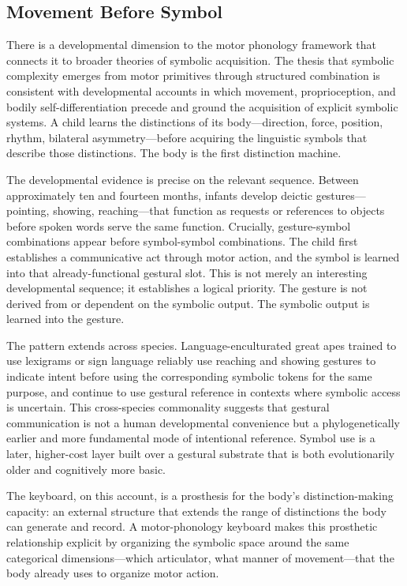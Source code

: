\documentclass[12pt,a4paper]{article}
\theoremstyle{plain}
\theoremstyle{definition}
\theoremstyle{remark}
\begin{document}
\subsection{Movement Before Symbol}

There is a developmental dimension to the motor phonology framework that connects
it to broader theories of symbolic acquisition. The thesis that symbolic
complexity emerges from motor primitives through structured combination is
consistent with developmental accounts in which movement, proprioception, and
bodily self-differentiation precede and ground the acquisition of explicit
symbolic systems. A child learns the distinctions of its body---direction,
force, position, rhythm, bilateral asymmetry---before acquiring the linguistic
symbols that describe those distinctions. The body is the first distinction
machine.

The developmental evidence is precise on the relevant sequence. Between
approximately ten and fourteen months, infants develop deictic gestures---
pointing, showing, reaching---that function as requests or references to objects
before spoken words serve the same function. Crucially, gesture-symbol
combinations appear before symbol-symbol combinations. The child first
establishes a communicative act through motor action, and the symbol is learned
into that already-functional gestural slot. This is not merely an interesting
developmental sequence; it establishes a logical priority. The gesture is not
derived from or dependent on the symbolic output. The symbolic output is learned
into the gesture.

The pattern extends across species. Language-enculturated great apes trained to
use lexigrams or sign language reliably use reaching and showing gestures to
indicate intent before using the corresponding symbolic tokens for the same
purpose, and continue to use gestural reference in contexts where symbolic access
is uncertain. This cross-species commonality suggests that gestural communication
is not a human developmental convenience but a phylogenetically earlier and more
fundamental mode of intentional reference. Symbol use is a later, higher-cost
layer built over a gestural substrate that is both evolutionarily older and
cognitively more basic.

The keyboard, on this account, is a prosthesis for the body's distinction-making
capacity: an external structure that extends the range of distinctions the body
can generate and record. A motor-phonology keyboard makes this prosthetic
relationship explicit by organizing the symbolic space around the same
categorical dimensions---which articulator, what manner of movement---that
the body already uses to organize motor action.
\end{document}

